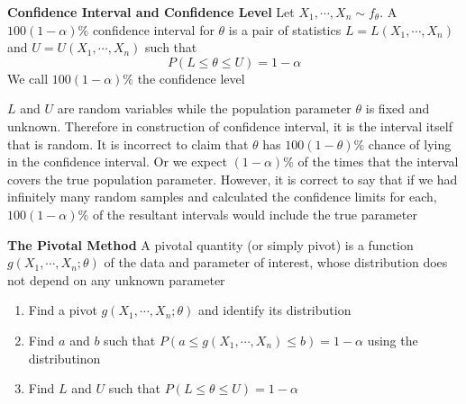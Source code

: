 \documentclass[11pt]{article}
\begin{document}
\begin{defn*}
  \textbf{Confidence Interval and Confidence Level} Let $X_1,\cdots, X_n \sim f_{\theta}$. A $100(1-\alpha)\%$ confidence interval for $\theta$ is a pair of statistics $L = L(X_1, \cdots, X_n)$ and $U=U(X_1, \cdots, X_n)$ such that
  \[
    P(L \leq \theta \leq U) = 1 - \alpha
  \]
  We call $100(1-\alpha)\%$ the confidence level
  \begin{rem}
    $L$ and $U$ are random variables while the population parameter $\theta$ is fixed and unknown. Therefore in construction of confidence interval, it is the interval itself that is random. It is incorrect to claim that $\theta$ has $100(1-\theta)\%$ chance of lying in the confidence interval. Or we expect $(1-\alpha)\%$ of the times that the interval covers the true population parameter. However, it is correct to say that if we had infinitely many random samples and calculated the confidence limits for each, $100(1-\alpha)\%$ of the resultant intervals would include the true parameter
  \end{rem}
\end{defn*}


\begin{defn*}
  \textbf{The Pivotal Method} A pivotal quantity (or simply pivot) is a function $g(X_1, \cdots, X_n;\theta)$ of the data and parameter of interest, whose distribution does not depend on any unknown parameter
  \begin{enumerate}
    \item Find a pivot $g(X_1, \cdots, X_n; \theta)$ and identify its distribution
    \item Find $a$ and $b$ such that $P(a\leq g(X_1, \cdots, X_n)\leq b) = 1-\alpha$ using the distributinon
    \item Find $L$ and $U$ such that $P(L\leq \theta \leq U) = 1-\alpha$
  \end{enumerate}
\end{defn*}
\end{document}

